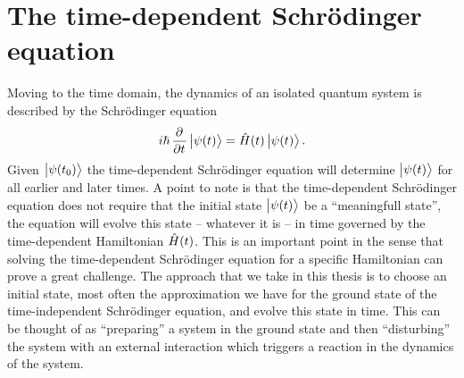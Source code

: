     \section{The time-dependent Schrödinger equation}
        Moving to the time domain, the dynamics of an isolated quantum system is
        described by the Schrödinger equation
        \begin{align}
            i\hslash \dpd{}{t}\ket{\psi(t)}
            = \hamil(t)\ket{\psi(t)}.
            \label{eq:tdse}
        \end{align}
        Given $\ket{\psi(t_0)}$ the time-dependent Schrödinger equation will
        determine $\ket{\psi(t)}$ for all earlier and later times.
        A point to note is that the time-dependent Schrödinger equation does not
        require that the initial state $\ket{\psi(t)}$ be a ``meaningfull
        state'', the equation will evolve this state -- whatever it is -- in
        time governed by the time-dependent Hamiltonian $\hat{H}(t)$.
        This is an important point in the sense that solving the time-dependent
        Schrödinger equation for a specific Hamiltonian can prove a great
        challenge.
        The approach that we take in this thesis is to choose an initial state,
        most often the approximation we have for the ground state of the
        time-independent Schrödinger equation, and evolve this state in time.
        This can be thought of as ``preparing'' a system in the ground state and
        then ``disturbing'' the system with an external interaction which
        triggers a reaction in the dynamics of the system.

